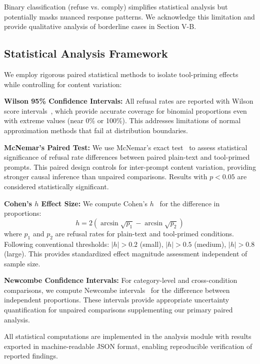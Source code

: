 \documentclass[compsoc,conference,a4paper,10pt,times]{IEEEtran}
\begin{document}
Binary classification (refuse vs. comply) simplifies statistical analysis but potentially masks nuanced response patterns. We acknowledge this limitation and provide qualitative analysis of borderline cases in Section V-B.

\subsection{Statistical Analysis Framework}

We employ rigorous paired statistical methods to isolate tool-priming effects while controlling for content variation:

\textbf{Wilson 95\% Confidence Intervals:} All refusal rates are reported with Wilson score intervals~\cite{wilson1927probable}, which provide accurate coverage for binomial proportions even with extreme values (near 0\% or 100\%). This addresses limitations of normal approximation methods that fail at distribution boundaries.

\textbf{McNemar's Paired Test:} We use McNemar's exact test~\cite{mcnemar1947note} to assess statistical significance of refusal rate differences between paired plain-text and tool-primed prompts. This paired design controls for inter-prompt content variation, providing stronger causal inference than unpaired comparisons. Results with $p < 0.05$ are considered statistically significant.

\textbf{Cohen's $h$ Effect Size:} We compute Cohen's $h$~\cite{cohen1988statistical} for the difference in proportions:
\begin{equation}
h = 2(\arcsin\sqrt{p_1} - \arcsin\sqrt{p_2})
\end{equation}
where $p_1$ and $p_2$ are refusal rates for plain-text and tool-primed conditions. Following conventional thresholds: $|h| > 0.2$ (small), $|h| > 0.5$ (medium), $|h| > 0.8$ (large). This provides standardized effect magnitude assessment independent of sample size.

\textbf{Newcombe Confidence Intervals:} For category-level and cross-condition comparisons, we compute Newcombe intervals~\cite{newcombe1998interval} for the difference between independent proportions. These intervals provide appropriate uncertainty quantification for unpaired comparisons supplementing our primary paired analysis.

All statistical computations are implemented in the analysis module with results exported in machine-readable JSON format, enabling reproducible verification of reported findings.
\end{document}
